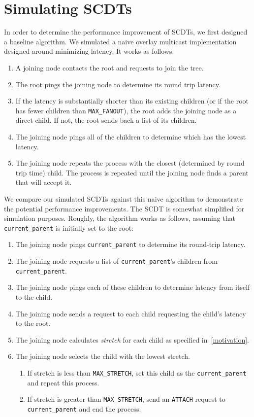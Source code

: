 \section{Simulating SCDTs}
\label{sim-scdt}
In order to determine the performance improvement of SCDTs, we first designed a baseline algorithm. We simulated a naive overlay multicast implementation designed around minimizing latency. It works as follows:

\begin{enumerate}  
	\item A joining node contacts the root and requests to join the tree. 
	\item The root pings the joining node to determine its round trip latency. 
	\item If the latency is substantially shorter than its existing children (or if the root has fewer children than \texttt{MAX\_FANOUT}), the root adds the joining node as a direct child. If not, the root sends back a list of its children.
	\item The joining node pings all of the children to determine which has the lowest latency.
	\item The joining node repeats the process with the closest (determined by round trip time) child. The process is repeated until the joining node finds a parent that will accept it.
\end{enumerate}

We compare our simulated SCDTs against this naive algorithm to demonstrate the potential performance improvements. The SCDT is somewhat simplified for simulation purposes. Roughly, the algorithm works as follows, assuming that \texttt{current\_parent} is initially set to the root:

\begin{enumerate}
	\item The joining node pings \texttt{current\_parent} to determine its round-trip latency.
	\item The joining node requests a list of \texttt{current\_parent}'s children from \texttt{current\_parent}.
	\item The joining node pings each of these children to determine latency from itself to the child.
	\item The joining node sends a request to each child requesting the child's latency to the root.
	\item The joining node calculates \textit{stretch} for each child as specified in~\autoref{motivation}.
	\item The joining node selects the child with the lowest stretch. 
	\begin{enumerate}
	\item If stretch is less than \texttt{MAX\_STRETCH}, set this child as the \texttt{current\_parent} and repeat this process. 
	\item If stretch is greater than \texttt{MAX\_STRETCH}, send an \texttt{ATTACH} request to \texttt{current\_parent} and end the process.
	\end{enumerate}
\end{enumerate}


